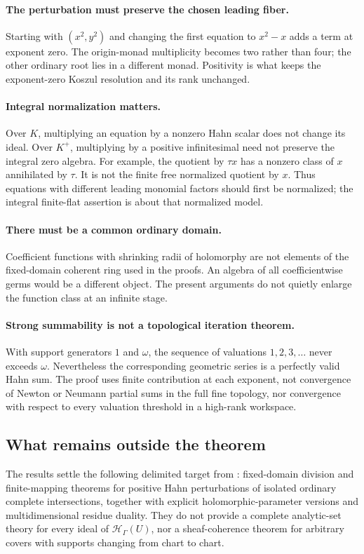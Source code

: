 \documentclass[11pt,letterpaper]{article}
\theoremstyle{definition}
\theoremstyle{remark}
\newcommand{\HH}{\mathcal H}
\newcommand{\Kp}{K^{+}}
\newcommand{\Hh}{\HH_{\Gamma}}
\begin{document}
\paragraph{The perturbation must preserve the chosen leading fiber.}
Starting with $(x^2,y^2)$ and changing the first equation to $x^2-x$ adds a term at exponent zero. The origin-monad multiplicity becomes two rather than four; the other ordinary root lies in a different monad. Positivity is what keeps the exponent-zero Koszul resolution and its rank unchanged.

\paragraph{Integral normalization matters.}
Over $K$, multiplying an equation by a nonzero Hahn scalar does not change its ideal. Over $\Kp$, multiplying by a positive infinitesimal need not preserve the integral zero algebra. For example, the quotient by $\tau x$ has a nonzero class of $x$ annihilated by $\tau$. It is not the finite free normalized quotient by $x$. Thus equations with different leading monomial factors should first be normalized; the integral finite-flat assertion is about that normalized model.

\paragraph{There must be a common ordinary domain.}
Coefficient functions with shrinking radii of holomorphy are not elements of the fixed-domain coherent ring used in the proofs. An algebra of all coefficientwise germs would be a different object. The present arguments do not quietly enlarge the function class at an infinite stage.

\paragraph{Strong summability is not a topological iteration theorem.}
With support generators $1$ and $\omega$, the sequence of valuations $1,2,3,\ldots$ never exceeds $\omega$. Nevertheless the corresponding geometric series is a perfectly valid Hahn sum. The proof uses finite contribution at each exponent, not convergence of Newton or Neumann partial sums in the full fine topology, nor convergence with respect to every valuation threshold in a high-rank workspace.

\subsection{What remains outside the theorem}
The results settle the following delimited target from \cite{Supplied}: fixed-domain division and finite-mapping theorems for positive Hahn perturbations of isolated ordinary complete intersections, together with explicit holomorphic-parameter versions and multidimensional residue duality. They do not provide a complete analytic-set theory for every ideal of $\Hh(U)$, nor a sheaf-coherence theorem for arbitrary covers with supports changing from chart to chart.
\end{document}
